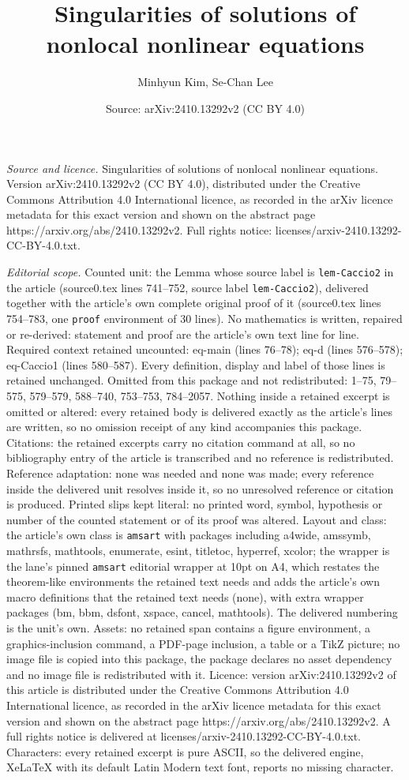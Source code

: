 \documentclass[10pt,a4paper]{amsart}
\title[Singularities of solutions of nonlocal nonlinear equations]{Singularities of solutions of nonlocal nonlinear equations}
\author{Minhyun Kim, Se-Chan Lee}
\date{Source: arXiv:2410.13292v2 (CC BY 4.0)}
\begin{document}
\maketitle

\noindent\emph{Source and licence.} Singularities of solutions of nonlocal nonlinear equations. Version arXiv:2410.13292v2 (CC BY 4.0), distributed under the Creative Commons Attribution 4.0 International licence, as recorded in the arXiv licence metadata for this exact version and shown on the abstract page https://arxiv.org/abs/2410.13292v2. Full rights notice: licenses/arxiv-2410.13292-CC-BY-4.0.txt.\par\smallskip

\noindent\textit{Editorial scope.} Counted unit: the Lemma whose source label is \texttt{lem-Caccio2} in the article (source0.tex lines 741--752, source label \texttt{lem-Caccio2}), delivered together with the article's own complete original proof of it (source0.tex lines 754--783, one \texttt{proof} environment of 30 lines). No mathematics is written, repaired or re-derived: statement and proof are the article's own text line for line. Required context retained uncounted: eq-main (lines 76--78); eq-d (lines 576--578); eq-Caccio1 (lines 580--587). Every definition, display and label of those lines is retained unchanged. Omitted from this package and not redistributed: 1--75, 79--575, 579--579, 588--740, 753--753, 784--2057. Nothing inside a retained excerpt is omitted or altered: every retained body is delivered exactly as the article's lines are written, so no omission receipt of any kind accompanies this package. Citations: the retained excerpts carry no citation command at all, so no bibliography entry of the article is transcribed and no reference is redistributed. Reference adaptation: none was needed and none was made; every reference inside the delivered unit resolves inside it, so no unresolved reference or citation is produced. Printed slips kept literal: no printed word, symbol, hypothesis or number of the counted statement or of its proof was altered. Layout and class: the article's own class is \texttt{amsart} with packages including a4wide, amssymb, mathrsfs, mathtools, enumerate, esint, titletoc, hyperref, xcolor; the wrapper is the lane's pinned \texttt{amsart} editorial wrapper at 10pt on A4, which restates the theorem-like environments the retained text needs and adds the article's own macro definitions that the retained text needs (none), with extra wrapper packages (bm, bbm, dsfont, xspace, cancel, mathtools). The delivered numbering is the unit's own. Assets: no retained span contains a figure environment, a graphics-inclusion command, a PDF-page inclusion, a table or a TikZ picture; no image file is copied into this package, the package declares no asset dependency and no image file is redistributed with it. Licence: version arXiv:2410.13292v2 of this article is distributed under the Creative Commons Attribution 4.0 International licence, as recorded in the arXiv licence metadata for this exact version and shown on the abstract page https://arxiv.org/abs/2410.13292v2. A full rights notice is delivered at licenses/arxiv-2410.13292-CC-BY-4.0.txt. Characters: every retained excerpt is pure ASCII, so the delivered engine, XeLaTeX with its default Latin Modern text font, reports no missing character.
\end{document}
